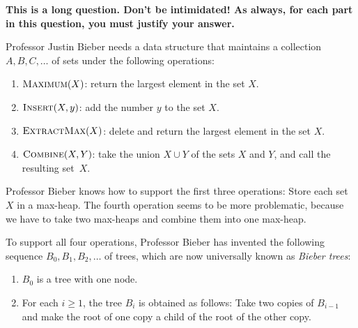 \documentclass[12pt]{article}
\newcommand{\Max}{\textsf{\sc Maximum}}
\newcommand{\Insert}{\textsf{\sc Insert}}
\newcommand{\EM}{\textsf{\sc ExtractMax}}
\newcommand{\Combine}{\textsf{\sc Combine}}
\newcounter{ques}
\newenvironment{question}{\stepcounter{ques}{\noindent\bf Question \arabic{ques}:}}{\vspace{5mm}}
\begin{document}
\begin{question}
{\bf This is a long question. Don't be intimidated! As always, for 
each part in this question, you must justify your answer.} 

Professor Justin Bieber needs a data structure that maintains a collection 
$A,B,C,\ldots$ of sets under the following operations:
\begin{enumerate} 
\item $\Max(X)$: return the largest element in the set $X$. 
\item $\Insert(X,y)$: add the number $y$ to the set $X$. 
\item $\EM(X)$: delete and return the largest element in the set $X$. 
\item $\Combine(X,Y)$: take the union $X \cup Y$ of the sets $X$ and 
      $Y$, and call the resulting set~$X$.  
\end{enumerate} 
Professor Bieber knows how to support the first three operations: 
Store each set $X$ in a max-heap. The fourth operation seems to be 
more problematic, because we have to take two max-heaps and combine 
them into one max-heap. 

To support all four operations, Professor Bieber has invented the 
following sequence $B_0,B_1,B_2,\ldots$ of trees, which are now 
universally known as \emph{Bieber trees}:     
\begin{enumerate} 
\item $B_0$ is a tree with one node. 
\item For each $i \geq 1$, the tree $B_i$ is obtained as follows: 
Take two copies of $B_{i-1}$ and make the root of one copy a child of the 
root of the other copy. 
\end{enumerate} 


\end{question}
\end{document}
